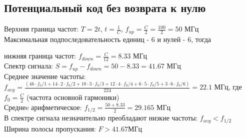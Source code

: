 \documentclass{article}
\begin{document}
\subsection{Потенциальный код без возврата к нулю}
Верхняя граница частот: $T=2t$, $t=\frac{1}{C}$, $f_{up} = \frac{C}{2} = \frac{100}{2} = 50$ МГц
\\
Максимальная подпоследовательность единиц - 6 и нулей - 6, тогда

нижняя граница частот: $f_{down} = \frac{C}{12} = 8.33$ МГц
\\
Спектр сигнала: $S = f_{up} - f_{down} = 50 - 8.33 = 41.67$ МГц
\\
Среднее значение частоты: $f_{avg} = \frac{(46 \cdot f_0/1 + 14 \cdot 2 \cdot f_0/2 + 18 \cdot 3 \cdot f_0/3 + 12 \cdot 4 \cdot f_0/4 + 6 \cdot 5 \cdot f_0/5 + 3 \cdot 6 \cdot f_0/6)}{224} =22.1$ МГц, где $f_0 = \frac{C}{2}$ (частота основной гармоники)
\\
Среднеe арифметическое: $f_{1/2} = \frac{50 + 8.33}{2} = 29.165$ МГц
\\
В спектре сигнала незначительно преобладают низкие частоты: $f_{avg} < f_{1/2}$
\\
Ширина полосы пропускания: $F > 41.67 $МГц

\begin{center}
\end{center}
\end{document}
